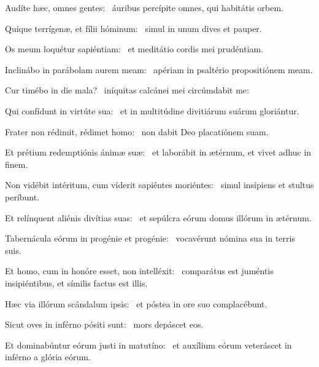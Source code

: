 \item Audíte hæc, omnes gentes:~\psstar{} áuribus percípite omnes, qui habitátis orbem.

\item Quique terrígenæ, et fílii hóminum:~\psstar{} simul in unum dives et pauper.

\item Os meum loquétur sapiéntiam:~\psstar{} et meditátio cordis mei prudéntiam.

\item Inclinábo in parábolam aurem meam:~\psstar{} apériam in psaltério propositiónem meam.

\item Cur timébo in die mala?~\psstar{} iníquitas calcánei mei circúmdabit me:

\item Qui confídunt in virtúte sua:~\psstar{} et in multitúdine divitiárum suárum gloriántur.

\item Frater non rédimit, rédimet homo:~\psstar{} non dabit Deo placatiónem suam.

\item Et prétium redemptiónis ánimæ suæ:~\psstar{} et laborábit in ætérnum, et vivet adhuc in finem.

\item Non vidébit intéritum, cum víderit sapiéntes moriéntes:~\psstar{} simul insípiens et stultus períbunt.

\item Et relínquent aliénis divítias suas:~\psstar{} et sepúlcra eórum domus illórum in ætérnum.

\item Tabernácula eórum in progénie et progénie:~\psstar{} vocavérunt nómina sua in terris suis.

\item Et homo, cum in honóre esset, non intelléxit:~\psstar{} comparátus est juméntis insipiéntibus, et símilis factus est illis.

\item Hæc via illórum scándalum ipsis:~\psstar{} et póstea in ore suo complacébunt.

\item Sicut oves in inférno pósiti sunt:~\psstar{} mors depáscet eos.

\item Et dominabúntur eórum justi in matutíno:~\psstar{} et auxílium eórum veteráscet in inférno a glória eórum.


